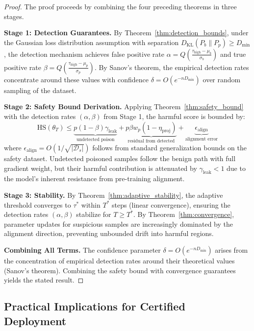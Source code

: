 \begin{proof}
The proof proceeds by combining the four preceding theorems in three stages.

\textbf{Stage 1: Detection Guarantees.}
By Theorem~\ref{thm:detection_bounds}, under the Gaussian loss distribution assumption with separation $D_{\text{KL}}(P_b \| P_p) \geq D_{\min}$, the detection mechanism achieves false positive rate $\alpha = Q\left(\frac{\tau_{\text{high}} - \mu_b}{\sigma_b}\right)$ and true positive rate $\beta = Q\left(\frac{\tau_{\text{high}} - \mu_p}{\sigma_p}\right)$. By Sanov's theorem, the empirical detection rates concentrate around these values with confidence $\delta = O(e^{-n D_{\min}})$ over random sampling of the dataset.

\textbf{Stage 2: Safety Bound Derivation.}
Applying Theorem~\ref{thm:safety_bound} with the detection rates $(\alpha, \beta)$ from Stage 1, the harmful score is bounded by:
\begin{equation*}
\text{HS}(\theta_T) \leq \underbrace{p(1-\beta)\gamma_{\text{leak}}}_{\text{undetected poison}} + \underbrace{p\beta w_p(1-\eta_{\text{proj}})}_{\text{residual from detected}} + \underbrace{\epsilon_{\text{align}}}_{\text{alignment error}}
\end{equation*}
where $\epsilon_{\text{align}} = O(1/\sqrt{|\mathcal{D}_s|})$ follows from standard generalization bounds on the safety dataset. Undetected poisoned samples follow the benign path with full gradient weight, but their harmful contribution is attenuated by $\gamma_{\text{leak}} < 1$ due to the model's inherent resistance from pre-training alignment.

\textbf{Stage 3: Stability.}
By Theorem~\ref{thm:adaptive_stability}, the adaptive threshold converges to $\tau^*$ within $T^*$ steps (linear convergence), ensuring the detection rates $(\alpha, \beta)$ stabilize for $T \geq T^*$. By Theorem~\ref{thm:convergence}, parameter updates for suspicious samples are increasingly dominated by the alignment direction, preventing unbounded drift into harmful regions.

\textbf{Combining All Terms.}
The confidence parameter $\delta = O(e^{-n D_{\min}})$ arises from the concentration of empirical detection rates around their theoretical values (Sanov's theorem). Combining the safety bound with convergence guarantees yields the stated result.
\end{proof}

\subsection{Practical Implications for Certified Deployment}
\label{subsec:certified_deployment}

